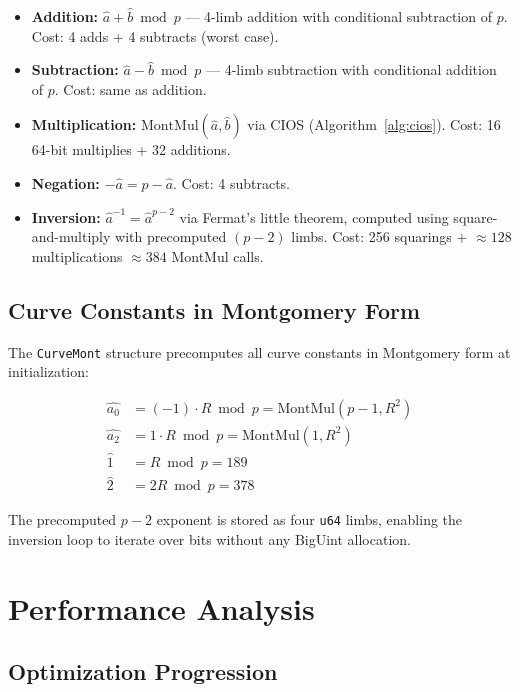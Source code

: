\documentclass[11pt,a4paper]{article}
\begin{document}
\begin{itemize}
    \item \textbf{Addition:} $\hat{a} + \hat{b} \bmod p$ --- 4-limb addition with conditional subtraction of $p$. Cost: 4 adds + 4 subtracts (worst case).
    \item \textbf{Subtraction:} $\hat{a} - \hat{b} \bmod p$ --- 4-limb subtraction with conditional addition of $p$. Cost: same as addition.
    \item \textbf{Multiplication:} $\mathrm{MontMul}(\hat{a}, \hat{b})$ via CIOS (Algorithm~\ref{alg:cios}). Cost: 16 64-bit multiplies + 32 additions.
    \item \textbf{Negation:} $-\hat{a} = p - \hat{a}$. Cost: 4 subtracts.
    \item \textbf{Inversion:} $\hat{a}^{-1} = \hat{a}^{p-2}$ via Fermat's little theorem, computed using square-and-multiply with precomputed $(p-2)$ limbs. Cost: 256 squarings + $\approx 128$ multiplications $\approx 384$ MontMul calls.
\end{itemize}

\subsection{Curve Constants in Montgomery Form}

The \texttt{CurveMont} structure precomputes all curve constants in Montgomery form at initialization:

\begin{align}
    \widehat{a_0} &= (-1) \cdot R \bmod p = \mathrm{MontMul}(p - 1, R^2) \\
    \widehat{a_2} &= 1 \cdot R \bmod p = \mathrm{MontMul}(1, R^2) \\
    \hat{1} &= R \bmod p = 189 \\
    \hat{2} &= 2R \bmod p = 378
\end{align}

The precomputed $p - 2$ exponent is stored as four \texttt{u64} limbs, enabling the inversion loop to iterate over bits without any BigUint allocation.

\section{Performance Analysis}
\label{sec:performance}

\subsection{Optimization Progression}
\end{document}
